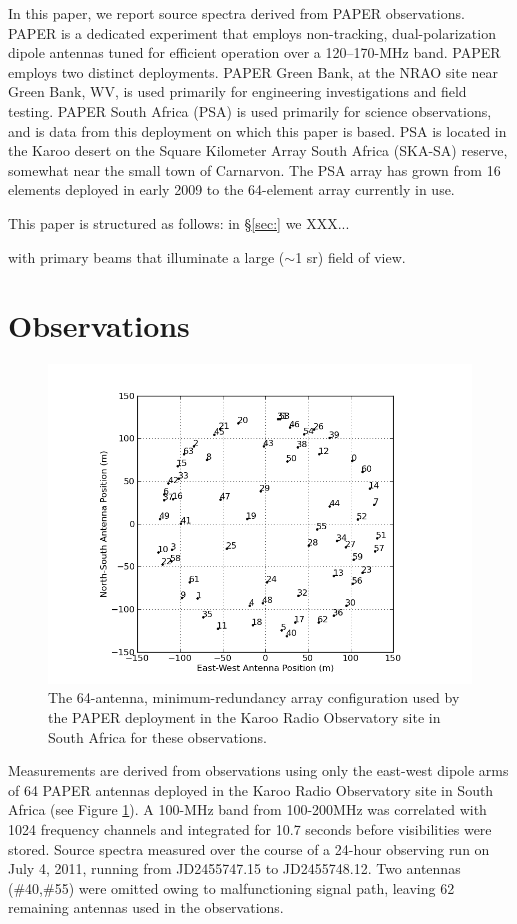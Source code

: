 \documentclass[preprint]{aastex}
\begin{document}
In this paper, we report source spectra derived from PAPER observations.
PAPER is a dedicated experiment 
that employs non-tracking, dual-polarization dipole antennas 
tuned for efficient operation over a 120--170-MHz band.
PAPER employs two distinct deployments. PAPER Green Bank, at the NRAO site 
near Green Bank, WV,
is used primarily for engineering investigations and field testing.  PAPER South Africa
(PSA) is used primarily for science observations, and is data from this deployment
on which this paper is based.  PSA is located in the Karoo desert
on the Square Kilometer Array
South Africa (SKA-SA) reserve, somewhat near the small town of Carnarvon.
The PSA array has grown from 16 elements deployed in early 2009 to the
64-element array currently in use.

This paper is structured as follows:
in \S\ref{sec:} we XXX...

with primary beams that illuminate
a large ($\sim$1 sr) field of view.

\section{Observations}
\label{sec:observations}

\begin{figure}\centering
\includegraphics[width=0.85\columnwidth]{plots/antpos.png}
\caption{The 64-antenna, minimum-redundancy array configuration used by the PAPER deployment
in the Karoo Radio Observatory site in South Africa for these observations.
}\label{fig:antpos}
\end{figure}

Measurements are derived from observations using only the east-west dipole arms of 64 PAPER antennas 
deployed in the Karoo Radio Observatory site in South Africa (see Figure \ref{fig:antpos}).  
A 100-MHz band from 100-200MHz was
correlated with 1024 frequency channels and integrated for 10.7 seconds before visibilities were stored.
Source spectra measured over the course of a 24-hour observing run on July 4, 2011, running
from JD2455747.15 to JD2455748.12.
Two antennas (\#40,\#55) were omitted owing to malfunctioning signal path, leaving 62 remaining antennas
used in the observations.
\end{document}
